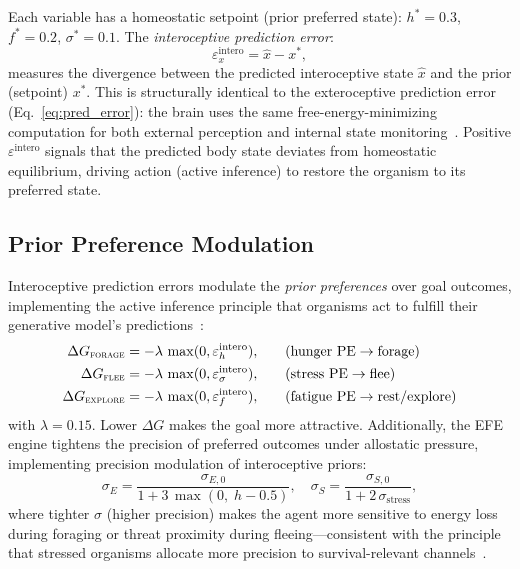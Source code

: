 \documentclass[11pt,a4paper]{article}
\begin{document}
Each variable has a homeostatic setpoint (prior preferred state):
$h^* = 0.3$, $f^* = 0.2$, $\sigma^* = 0.1$.
The \emph{interoceptive prediction error}:
\begin{equation}\label{eq:allo_error}
  \varepsilon_x^\text{intero} = \hat{x} - x^*,
\end{equation}
measures the divergence between the predicted interoceptive state $\hat{x}$
and the prior (setpoint) $x^*$.
This is structurally identical to the exteroceptive prediction error
(Eq.~\ref{eq:pred_error}): the brain uses the same free-energy-minimizing
computation for both external perception and internal state
monitoring~\cite{seth2016}.
Positive $\varepsilon^\text{intero}$ signals that the predicted body state
deviates from homeostatic equilibrium, driving action (active inference) to
restore the organism to its preferred state.

\subsection{Prior Preference Modulation}

Interoceptive prediction errors modulate the \emph{prior preferences}
over goal outcomes, implementing the active inference principle that
organisms act to fulfill their generative model's
predictions~\cite{friston2010,pezzulo2015}:
\begin{equation}\label{eq:allo_bias}
\begin{aligned}
  \Delta G_\textsc{forage}  &= -\lambda\,\max(0, \varepsilon_h^\text{intero}), &\quad &\text{(hunger PE} \to \text{forage)} \\
  \Delta G_\textsc{flee}    &= -\lambda\,\max(0, \varepsilon_\sigma^\text{intero}), &\quad &\text{(stress PE} \to \text{flee)} \\
  \Delta G_\textsc{explore} &= -\lambda\,\max(0, \varepsilon_f^\text{intero}), &\quad &\text{(fatigue PE} \to \text{rest/explore)}
\end{aligned}
\end{equation}
with $\lambda = 0.15$.
Lower $\Delta G$ makes the goal more attractive.
Additionally, the EFE engine tightens the precision of preferred outcomes
under allostatic pressure, implementing precision modulation
of interoceptive priors:
\begin{equation}\label{eq:allo_precision}
  \sigma_E = \frac{\sigma_{E,0}}{1 + 3\,\max(0,\; h - 0.5)},
  \quad
  \sigma_S = \frac{\sigma_{S,0}}{1 + 2\,\sigma_\text{stress}},
\end{equation}
where tighter $\sigma$ (higher precision) makes the agent more sensitive
to energy loss during foraging or threat proximity during
fleeing---consistent with the principle that stressed organisms
allocate more precision to survival-relevant
channels~\cite{stephan2016}.
\end{document}

